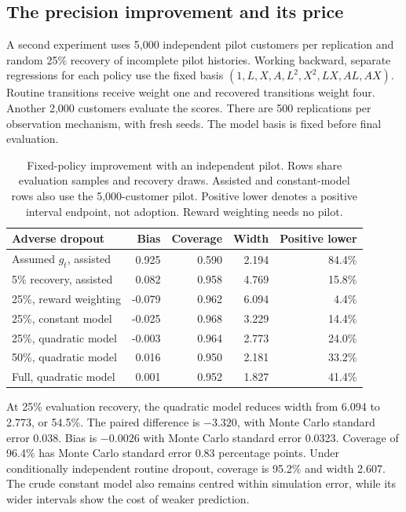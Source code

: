 \subsection{The precision improvement and its price}
A second experiment uses 5,000 independent pilot customers per
replication and random 25\% recovery of incomplete pilot histories.
Working backward, separate regressions for each policy use the fixed basis
$(1,L,X,A,L^2,X^2,LX,AL,AX)$. Routine transitions receive weight one and
recovered transitions weight four. Another 2,000 customers evaluate the
scores. There are 500 replications per observation mechanism, with fresh
seeds. The model basis is fixed before final evaluation.

\begin{table}[htbp]
\centering\small
\begin{tabular}{lrrrr}
\toprule
Adverse dropout & Bias & Coverage & Width & Positive lower\\
\midrule
Assumed $g_t$, assisted & 0.925 & 0.590 & 2.194 & 84.4\%\\
5\% recovery, assisted & 0.082 & 0.958 & 4.769 & 15.8\%\\
25\%, reward weighting & -0.079 & 0.962 & 6.094 & 4.4\%\\
25\%, constant model & -0.025 & 0.968 & 3.229 & 14.4\%\\
25\%, quadratic model & -0.003 & 0.964 & 2.773 & 24.0\%\\
50\%, quadratic model & 0.016 & 0.950 & 2.181 & 33.2\%\\
Full, quadratic model & 0.001 & 0.952 & 1.827 & 41.4\%\\
\bottomrule
\end{tabular}
\caption{Fixed-policy improvement with an independent pilot. Rows share
evaluation samples and recovery draws. Assisted and constant-model rows
also use the 5,000-customer pilot. Positive lower denotes a positive
interval endpoint, not adoption. Reward weighting needs no pilot.}
\end{table}

At 25\% evaluation recovery, the quadratic model reduces width from 6.094
to 2.773, or 54.5\%. The paired difference is $-3.320$, with Monte Carlo
standard error 0.038. Bias is $-0.0026$ with Monte Carlo standard error
0.0323. Coverage of 96.4\% has Monte Carlo standard error 0.83 percentage
points. Under conditionally independent routine dropout, coverage is 95.2\%
and width 2.607. The crude constant model also remains centred within
simulation error, while its wider intervals show the cost of weaker
prediction.

